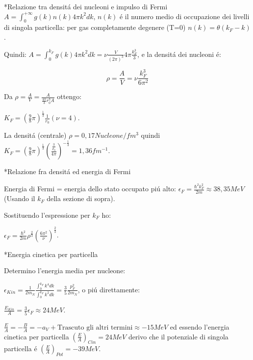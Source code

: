 *Relazione tra densit\'a dei nucleoni e impulso di Fermi
$A=\int_0^{+\infty}g(k)n(k)4\pi k^2dk$, $n(k)$ \'e il numero medio di occupazione dei livelli di singola particella: per gas completamente degenere (T=0)    
 $n(k)=\theta (k_F-k)$. 
 
Quindi: $A=\int_0^{k_F}g(k)4\pi k^2dk=\nu \frac{V}{(2\pi)^3}4\pi \frac{k_F^3}{3}$, e la densit\'a dei nucleoni \'e:
 
 \begin{equation*}
 \rho =\frac{A}{V}=\nu \frac{k_F^3}{6\pi^2}
 \end{equation*}

Da $\rho=\frac{A}{V}=\frac{A}{\frac{4\pi}{3}r_0^3A}$ ottengo:

$K_F=(\frac{9}{8}\pi)^{\frac{1}{3}}\frac{1}{r_0} (\nu=4)$.

La densit\'a (centrale) $\rho=0,17 Nucleone/fm^3$ quindi $K_F=(\frac{9}{8}\pi)^{\frac{1}{3}}(\frac{\frac{3}{\rho_0}}{4\pi})^{-\frac{1}{3}}=1,36 fm^{-1}$.

*Relazione fra densit\'a ed energia di Fermi

Energia di Fermi = energia dello stato occupato pi\'u alto: $\epsilon_F=\frac{\hbar^2k_F^2}{2m}\approx 38,35 MeV$ (Usando il $k_F$ della sezione di sopra).

Sostituendo l'espressione per $k_F$ ho:

$\epsilon_F=\frac{\hbar^2}{2m}\rho^{\frac{2}{3}}(\frac{6\pi^2}{\nu})^{\frac{2}{3}}$.

*Energia cinetica per particella

Determino l'energia media per nucleone:

$\epsilon_{Kin}=\frac{1}{2m_N}\frac{\int_0^{k_F}k^4dk}{\int_0^{k_F}k^2dk}=\frac{3}{5}\frac{p_F^2}{2m_N}$, o pi\'u direttamente:

$\frac{E_{Kin}}{A}=\frac{3}{5}\epsilon_F \approx 24MeV$.

$\frac{E}{A}=- \frac{B}{A}=-a_V+\text{Trascuto gli altri termini}\approx-15 MeV$ ed essendo l'energia cinetica per particella $(\frac{E}{A})_{Cin}=24 MeV$ derivo che il potenziale di singola particella \'e $(\frac{E}{A})_{Pot}=-39MeV$.